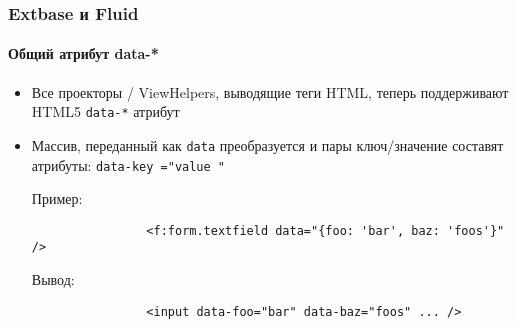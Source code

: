 \begin{frame}[fragile]
	\frametitle{Extbase и Fluid}
	\framesubtitle{Общий атрибут data-*}


	\begin{itemize}
		\item Все проекторы / ViewHelpers, выводящие теги HTML, теперь поддерживают HTML5 \texttt{data-*} атрибут
		\item Массив, переданный как \texttt{data} преобразуется и пары ключ/значение составят атрибуты:
			\texttt{data-\begingroup\color{typo3orange}key\endgroup
				="\begingroup\color{typo3orange}value\endgroup
				"}\newline

			Пример:
			\begin{lstlisting}
				<f:form.textfield data="{foo: 'bar', baz: 'foos'}" />
			\end{lstlisting}

			Вывод:
			\begin{lstlisting}
				<input data-foo="bar" data-baz="foos" ... />
			\end{lstlisting}
		
	\end{itemize}

\end{frame}


